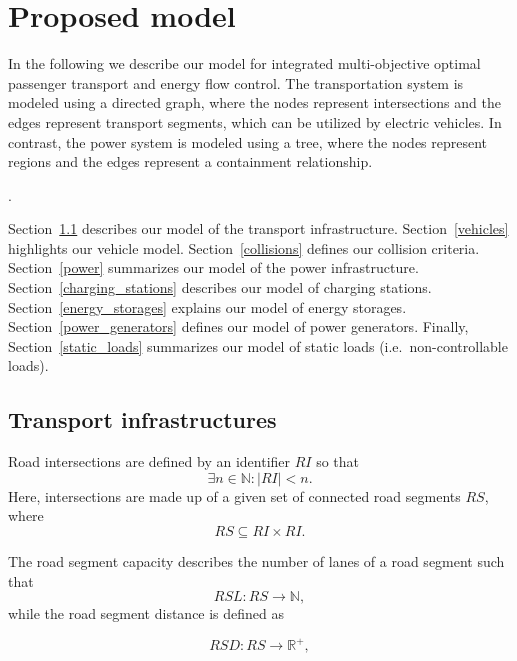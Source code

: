 \section{Proposed model}
\label{proposed_model}



In the following we describe our model for integrated multi-objective optimal passenger transport and energy flow control. 
The transportation system is modeled using a directed graph, where the nodes represent intersections and the edges represent transport segments, which can be utilized by electric vehicles. In contrast, the power system is modeled using a tree, where the nodes represent regions and the edges represent a containment relationship.

.

Section~\ref{transport} describes our model of the transport infrastructure. Section~\ref{vehicles} highlights our vehicle model. Section~\ref{collisions} defines our collision criteria. Section~\ref{power} summarizes our model of the power infrastructure. Section~\ref{charging_stations} describes our model of charging stations. Section~\ref{energy_storages} explains our model of energy storages. Section~\ref{power_generators} defines our model of power generators. Finally, Section~\ref{static_loads} summarizes our model of static loads (i.e.\ non-controllable loads).


\subsection{Transport infrastructures}
\label{transport}
Road intersections are defined by an identifier $RI$ so that
\[
\exists n \in \mathbb{N} : |RI| < n \mathrm{.}
\]
Here, intersections are made up of a given set of connected road segments $RS$, where
\[
RS \subseteq RI \times RI \mathrm{.}
\]

The road segment capacity describes the number of lanes of a road segment such that
\[
RSL : RS \rightarrow \mathbb{N} \mathrm{,}
\]
while the road segment distance is defined as 

\[
RSD : RS \rightarrow \mathbb{R}^+ \mathrm{,}
\]

